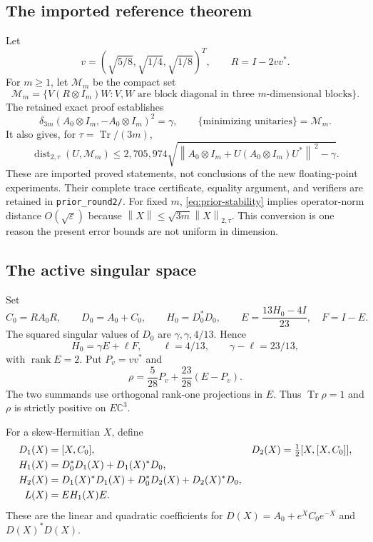 \documentclass[11pt]{article}
\theoremstyle{remark}\newtheorem{remark}[theorem]{Remark}
\newcommand{\C}{\mathbb C}
\newcommand{\Tr}{\operatorname{Tr}}
\newcommand{\rank}{\operatorname{rank}}
\newcommand{\dd}{\delta}
\newcommand{\norm}[1]{\left\lVert#1\right\rVert}
\begin{document}
\subsection{The imported reference theorem}
Let
\begin{equation}\label{eq:R}
 v=\left(\sqrt{5/8},\sqrt{1/4},\sqrt{1/8}\right)^T,\qquad R=I-2vv^*.
\end{equation}
For $m\ge1$, let $\mathcal M_m$ be the compact set
\[
 \mathcal M_m=\{V(R\otimes I_m)W:V,W\text{ are block diagonal in three }m\text{-dimensional blocks}\}.
\]
The retained exact proof establishes
\begin{equation}\label{eq:prior-rigidity}
 \dd_{3m}(A_0\otimes I_m,-A_0\otimes I_m)^2=\gamma,
 \qquad\{
 \text{minimizing unitaries}\}=\mathcal M_m.
\end{equation}
It also gives, for $\tau=\Tr/(3m)$,
\begin{equation}\label{eq:prior-stability}
 \operatorname{dist}_{2,\tau}(U,\mathcal M_m)
 \le 2{,}705{,}974\sqrt{
 \norm{A_0\otimes I_m+U(A_0\otimes I_m)U^*}^{\,2}-\gamma}.
\end{equation}
These are imported proved statements, not conclusions of the new floating-point experiments. Their complete trace certificate, equality argument, and verifiers are retained in \texttt{prior\_round2/}. For fixed $m$, \eqref{eq:prior-stability} implies operator-norm distance $O(\sqrt\varepsilon)$ because $\norm X\le\sqrt{3m}\norm X_{2,\tau}$. This conversion is one reason the present error bounds are not uniform in dimension.

\subsection{The active singular space}
Set
\[
 C_0=RA_0R,\qquad D_0=A_0+C_0,\qquad H_0=D_0^*D_0,\qquad
 E=\frac{13H_0-4I}{23},\quad F=I-E.
\]
The squared singular values of $D_0$ are $\gamma,\gamma,4/13$. Hence
\begin{equation}\label{eq:gap-ref}
 H_0=\gamma E+\ell F,\qquad \ell=4/13,\qquad \gamma-\ell=23/13,
\end{equation}
with $\rank E=2$. Put $P_v=vv^*$ and
\begin{equation}\label{eq:rho}
 \rho=\frac5{28}P_v+\frac{23}{28}(E-P_v).
\end{equation}
The two summands use orthogonal rank-one projections in $E$. Thus $\Tr\rho=1$ and $\rho$ is strictly positive on $E\C^3$.

For a skew-Hermitian $X$, define
\begin{align}\label{eq:taylor}
 D_1(X)&=[X,C_0],&D_2(X)&=\tfrac12[X,[X,C_0]],\notag\\
 H_1(X)&=D_0^*D_1(X)+D_1(X)^*D_0,\notag\\
 H_2(X)&=D_1(X)^*D_1(X)+D_0^*D_2(X)+D_2(X)^*D_0,\\
 L(X)&=EH_1(X)E.\notag
\end{align}
These are the linear and quadratic coefficients for $D(X)=A_0+e^X C_0e^{-X}$ and $D(X)^*D(X)$.
\end{document}

